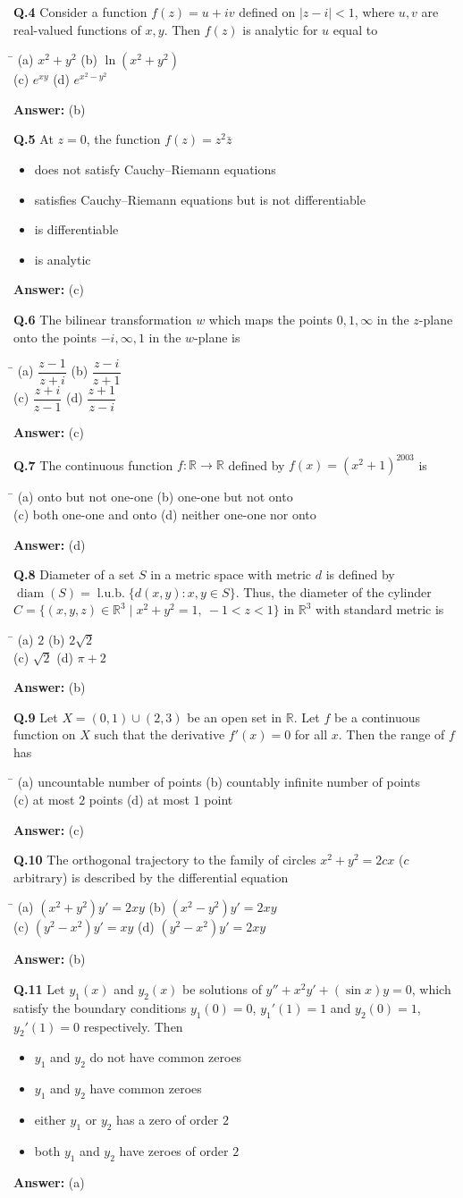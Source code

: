 \documentclass[11pt,a4paper]{article}
\newcommand{\optsfour}[4]{%
  \begin{tabbing}
    \hspace{0.48\linewidth}\=\kill
    (a) #1 \> (b) #2 \\[2pt]
    (c) #3 \> (d) #4
  \end{tabbing}%
}
\newcommand{\optslist}[4]{%
  \begin{itemize}
    \setlength{\itemsep}{2pt}\setlength{\parskip}{0pt}
    \item[(a)] #1
    \item[(b)] #2
    \item[(c)] #3
    \item[(d)] #4
  \end{itemize}%
}
\newcommand{\ans}[1]{\textbf{Answer:} #1\par\medskip}
\begin{document}
\textbf{Q.4} Consider a function $f(z) = u + iv$ defined on $|z - i| < 1$, where $u, v$ are real-valued functions of $x, y$. Then $f(z)$ is analytic for $u$ equal to
\optsfour{$x^2 + y^2$}{$\ln(x^2 + y^2)$}{$e^{xy}$}{$e^{x^2 - y^2}$}
\ans{(b)}

\textbf{Q.5} At $z = 0$, the function $f(z) = z^2 \bar{z}$
\optslist{does not satisfy Cauchy--Riemann equations}{satisfies Cauchy--Riemann equations but is not differentiable}{is differentiable}{is analytic}
\ans{(c)}

\textbf{Q.6} The bilinear transformation $w$ which maps the points $0, 1, \infty$ in the $z$-plane onto the points $-i, \infty, 1$ in the $w$-plane is
\optsfour{$\dfrac{z - 1}{z + i}$}{$\dfrac{z - i}{z + 1}$}{$\dfrac{z + i}{z - 1}$}{$\dfrac{z + 1}{z - i}$}
\ans{(c)}

\textbf{Q.7} The continuous function $f : \mathbb{R} \to \mathbb{R}$ defined by $f(x) = (x^2 + 1)^{2003}$ is
\optsfour{onto but not one-one}{one-one but not onto}{both one-one and onto}{neither one-one nor onto}
\ans{(d)}

\textbf{Q.8} Diameter of a set $S$ in a metric space with metric $d$ is defined by $\operatorname{diam}(S) = \operatorname{l.u.b.}\{d(x,y) : x, y \in S\}$. Thus, the diameter of the cylinder $C = \{(x,y,z) \in \mathbb{R}^3 \mid x^2 + y^2 = 1,\ -1 < z < 1\}$ in $\mathbb{R}^3$ with standard metric is
\optsfour{$2$}{$2\sqrt{2}$}{$\sqrt{2}$}{$\pi + 2$}
\ans{(b)}

\textbf{Q.9} Let $X = (0,1) \cup (2,3)$ be an open set in $\mathbb{R}$. Let $f$ be a continuous function on $X$ such that the derivative $f'(x) = 0$ for all $x$. Then the range of $f$ has
\optsfour{uncountable number of points}{countably infinite number of points}{at most $2$ points}{at most $1$ point}
\ans{(c)}

\textbf{Q.10} The orthogonal trajectory to the family of circles $x^2 + y^2 = 2cx$ ($c$ arbitrary) is described by the differential equation
\optsfour{$(x^2 + y^2)y' = 2xy$}{$(x^2 - y^2)y' = 2xy$}{$(y^2 - x^2)y' = xy$}{$(y^2 - x^2)y' = 2xy$}
\ans{(b)}

\textbf{Q.11} Let $y_1(x)$ and $y_2(x)$ be solutions of $y'' + x^2 y' + (\sin x)y = 0$, which satisfy the boundary conditions $y_1(0) = 0$, $y_1'(1) = 1$ and $y_2(0) = 1$, $y_2'(1) = 0$ respectively. Then
\optslist{$y_1$ and $y_2$ do not have common zeroes}{$y_1$ and $y_2$ have common zeroes}{either $y_1$ or $y_2$ has a zero of order $2$}{both $y_1$ and $y_2$ have zeroes of order $2$}
\ans{(a)}
\end{document}
